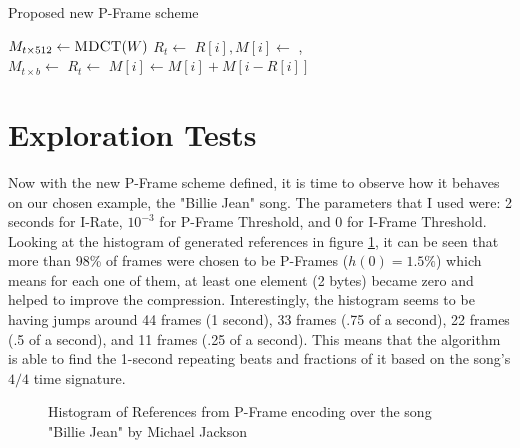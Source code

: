 \begin{algorithm}[ht]
\caption{Proposed new P-Frame scheme}\label{alg:scheme}
\begin{algorithmic}
    \State $M_{t \times 512} \gets \Call{MDCT}{W}$
    \State $R_t \gets$ 
        \State $R[i], M[i] \gets$ 
    \EndFor
    \State \Return {}, 
\EndFunction
\\
    \State $M_{t \times b} \gets$ 
    \State $R_{t} \gets$ 
            \State $M[i] \gets M[i] + M[i-R[i]]$
        \EndIf
    \EndFor
    \State \Return {}
\EndFunction
\end{algorithmic}
\end{algorithm}

\section{Exploration Tests}
\label{sec:tests}

Now with the new P-Frame scheme defined, it is time to observe how it behaves on our chosen example, the "Billie Jean" song. The parameters that I used were: 2 seconds for I-Rate, $10^{-3}$ for P-Frame Threshold, and 0 for I-Frame Threshold. Looking at the histogram of generated references in figure \ref{fig:hist}, it can be seen that more than 98\% of frames were chosen to be P-Frames ($h(0)=1.5\%$) which means for each one of them, at least one element (2 bytes) became zero and helped to improve the compression. Interestingly, the histogram seems to be having jumps around 44 frames (1 second), 33 frames (.75 of a second), 22 frames (.5 of a second), and 11 frames (.25 of a second). This means that the algorithm is able to find the 1-second repeating beats and fractions of it based on the song's $4/4$ time signature. 

\begin{figure}[ht] 
    \centering
    
    \caption{Histogram of References from P-Frame encoding over the song "Billie Jean" by Michael Jackson}
    \label{fig:hist}
\end{figure}

